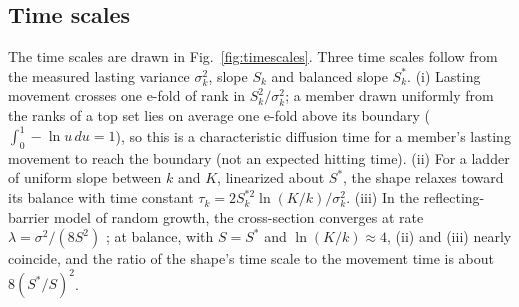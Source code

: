 \documentclass[10pt]{article}
\begin{document}
\subsection{Time scales}\label{sec:timescales}
The time scales are drawn in Fig.~\ref{fig:timescales}.
Three time scales follow from the measured lasting variance $\sigma_k^2$, slope $S_k$ and balanced slope $S^\ast_k$. (i) Lasting movement crosses one e-fold of rank in $S_k^2/\sigma_k^2$; a member drawn uniformly from the ranks of a top set lies on average one e-fold above its boundary ($\int_0^1 -\ln u\,du = 1$), so this is a characteristic diffusion time for a member's lasting movement to reach the boundary (not an expected hitting time). (ii) For a ladder of uniform slope between $k$ and $K$, linearized about $S^\ast$, the shape relaxes toward its balance with time constant $\tau_k = 2S^{\ast2}_k\ln(K/k)/\sigma_k^2$. (iii) In the reflecting-barrier model of random growth, the cross-section converges at rate $\lambda = \sigma^2/(8S^2)$ \cite{gllm2016}; at balance, with $S = S^\ast$ and $\ln(K/k)\approx 4$, (ii) and (iii) nearly coincide, and the ratio of the shape's time scale to the movement time is about $8(S^\ast/S)^2$.
\end{document}
